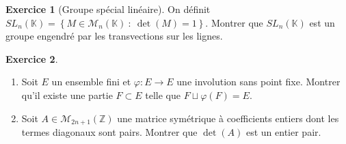 \documentclass[french]{book}
\newcommand{\Z}{\mathbb{Z}}
\newcommand{\K}{\mathbb{K}}
\theoremstyle{definition}
\newtheorem{ex}{Exercice}[chapter]
\theoremstyle{theorem}
\theoremstyle{remark}
\begin{document}
\begin{ex}[Groupe spécial linéaire]
	On définit $SL_n(\K)=\left\{M\in\mathcal{M}_n(\K)\ : \ \det(M)=1\right\}$. Montrer que $SL_n(\K)$ est un groupe engendré par les transvections sur les lignes.
\end{ex}

\begin{ex}
	\begin{enumerate}
		\item Soit $E$ un ensemble fini et $\varphi:E\to E$ une involution sans point fixe. Montrer qu'il existe une partie $F\subset E$ telle que $F\sqcup\varphi(F)=E$.
		\item Soit $A\in\mathcal{M}_{2n+1}(\Z)$ une matrice symétrique à coefficients entiers dont les termes diagonaux sont pairs. Montrer que $\det(A)$ est un entier pair.
	\end{enumerate}
\end{ex}
\end{document}
